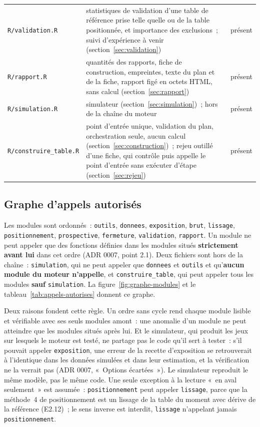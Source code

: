 \documentclass[a4paper,11pt]{article}
\newcommand{\code}[1]{\texttt{\small #1}}
\begin{document}
\begin{center}
\begin{longtable}{@{}p{4.2cm}p{7.6cm}p{2.9cm}@{}}
\code{R/validation.R} & statistiques de validation d'une table de référence
prise telle quelle ou de la table positionnée, et importance des
exclusions~; suivi d'expérience à venir
(section~\ref{sec:validation}) & présent \\
\code{R/rapport.R} & quantités des rapports, fiche de construction, empreintes,
texte du plan et de la fiche, rapport figé en octets HTML, sans calcul
(section~\ref{sec:rapport}) & présent \\
\code{R/simulation.R} & simulateur (section~\ref{sec:simulation})~; hors de la
chaîne du moteur & présent \\
\code{R/construire\_table.R} & point d'entrée unique, validation du plan,
orchestration seule, aucun calcul (section~\ref{sec:construction})~; rejeu
outillé d'une fiche, qui contrôle puis appelle le point d'entrée sans
exécuter d'étape (section~\ref{sec:rejeu}) & présent \\
\end{longtable}
\end{center}

\subsection{Graphe d'appels autorisés}
\label{sec:graphe}

Les modules sont ordonnés~: \code{outils}, \code{donnees}, \code{exposition},
\code{brut}, \code{lissage}, \code{positionnement}, \code{prospective},
\code{fermeture}, \code{validation}, \code{rapport}. Un module ne peut appeler
que des fonctions définies dans les modules situés \textbf{strictement avant
lui} dans cet ordre (ADR 0007, point 2.1). Deux fichiers sont hors de la
chaîne~: \code{simulation}, qui ne peut appeler que \code{donnees} et
\code{outils} et qu'\textbf{aucun module du moteur n'appelle}, et
\code{construire\_table}, qui peut appeler tous les modules \textbf{sauf}
\code{simulation}. La figure~\ref{fig:graphe-modules} et le
tableau~\ref{tab:appels-autorises} donnent ce graphe.

\medskip
Deux raisons fondent cette règle. Un ordre sans cycle rend chaque module
lisible et vérifiable avec ses seuls modules amont~: une anomalie d'un module
ne peut atteindre que les modules situés après lui. Et le simulateur, qui
produit les jeux sur lesquels le moteur est testé, ne partage pas le code
qu'il sert à tester~: s'il pouvait appeler \code{exposition}, une erreur de la
recette d'exposition se retrouverait à l'identique dans les données simulées
et dans leur estimation, et la vérification ne la verrait pas (ADR 0007,
«~Options écartées~»). Le simulateur reproduit le même modèle, pas le même
code. Une seule exception à la lecture «~en aval seulement~» est assumée~:
\code{positionnement} peut appeler \code{lissage}, parce que la méthode~4 de
positionnement est un lissage de la table du moment avec dérive de la
référence (E2.12)~; le sens inverse est interdit, \code{lissage} n'appelant
jamais \code{positionnement}.
\end{document}
